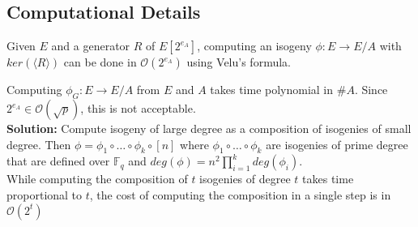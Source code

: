 \subsection{Computational Details}

Given $E$ and a generator $R$ of $E[2^{e_A}]$, computing an isogeny $\phi:E \to E/A$ with $ker(\langle R \rangle)$  can be done in $\mathcal{O}(2^{e_A})$ using Velu's formula. %

Computing $\phi_G : E \to E/A$ from $E$ and $A$ takes time polynomial in $\#A$. Since $2^{e_A} \in \mathcal{O}(\sqrt{p})$, this is not acceptable.\\
	
	\textbf{Solution:} Compute isogeny of large degree as a composition of isogenies of small degree. Then $\phi = \phi_1 \circ \dots \circ \phi_k \circ [n]$ where $\phi_1 \circ \dots \circ \phi_k$ are isogenies of prime degree that are defined over $\mathbb{F}_q$ and $deg(\phi) = n^2 \prod^k_{i=1} deg(\phi_i)$.\\
	 While computing the composition of $t$ isogenies of degree $t$ takes time proportional to $t$, the cost of computing the composition in a single step is in $\mathcal{O}(2^t)$\\

